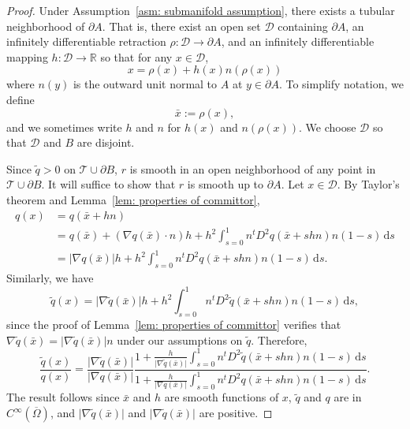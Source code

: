 \documentclass[reqno]{amsart}
\newcommand{\Real}{\mathbb{R}}
\newcommand{\1}{\mathds{1}}
\renewcommand{\d}{\mathrm{d}}
\newcommand{\grad}{\nabla}
\theoremstyle{definition}
\theoremstyle{remark}
\newcommand{\D}{\mathscr{T}}
\newcommand{\tub}{\mathscr{D}}
\begin{document}
\begin{proof}
  Under Assumption~\ref{asm: submanifold assumption}, there exists a tubular neighborhood of $\partial A$. That is, there exist an open set $\tub$ containing $\partial A$, an infinitely differentiable retraction $\rho : \tub \rightarrow \partial A$, and an infinitely differentiable mapping $h: \tub \rightarrow \Real$ so that for any $x \in \tub$, 
\begin{equation*}
  x = \rho(x) + h(x) n(\rho(x))
\end{equation*}
where $n(y)$ is the outward unit normal to $A$ at $y \in \partial A$.  To simplify notation, we define
\begin{equation*}
  \bar x := \rho(x),
\end{equation*}
and we sometimes write $h$ and $n$ for $h(x)$ and $n(\rho(x))$. We choose $\tub$ so that $\tub$ and $B$ are disjoint. 

  Since $\tilde q >0$ on $\D \cup \partial B$, $r$ is smooth in an open neighborhood of any point in $\D \cup \partial B$. It will suffice to show that $r$ is smooth up to $\partial A$. 
  Let $x \in \tub$. 
  By Taylor's theorem and Lemma~\ref{lem: properties of committor},
  \begin{align*}
    q(x) &= q(\bar x + h n) \\
         &= q(\bar x) + (\grad q(\bar x) \cdot n)h + h^2 \int_{s=0}^1 n^t D^2 q(\bar x + shn) n (1-s) \, \d s \\
    &= \lvert \grad q(\bar x) \rvert h +  h^2 \int_{s=0}^1 n^t D^2 q(\bar x + shn) n (1-s) \, \d s.
  \end{align*}
  Similarly, we have
  \begin{equation*}
    \tilde q(x) = \lvert \grad \tilde q(\bar x) \rvert h +  h^2 \int_{s=0}^1 n^t D^2 \tilde q(\bar x + shn) n (1-s) \, \d s,
  \end{equation*}
  since the proof of Lemma~\ref{lem: properties of committor} verifies that $\grad \tilde q(\bar x) = \lvert \grad \tilde q(\bar x) \rvert n$ under our assumptions on $\tilde q$.
   Therefore,
  \begin{equation*}
    \frac{\tilde q( x)}{q( x)}
    =
    \frac{\lvert \grad \tilde q(\bar x) \rvert}{\lvert \grad q(\bar x) \rvert}
    \frac{1+ \frac{h}{\lvert \grad \tilde q(\bar x) \rvert}  \int_{s=0}^1 n^t D^2 \tilde q(\bar x + shn) n (1-s) \, \d s }{1+\frac{h}{\lvert \grad q(\bar x) \rvert}  \int_{s=0}^1 n^t D^2  q(\bar x + shn) n (1-s) \, \d s}.
  \end{equation*}
  The result follows since $\bar x$ and $h$ are smooth functions of $x$, $\tilde q$ and $q$ are in $C^\infty(\overline{\Omega})$, and $\lvert \grad \tilde q(\bar x) \rvert$ and $\lvert \grad \tilde q(\bar x) \rvert$ are positive. 
\end{proof}
\end{document}

